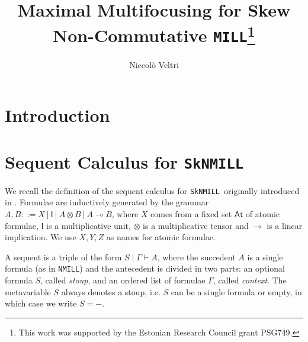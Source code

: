 \documentclass[runningheads]{llncs}
\newcommand{\ot}{\otimes}
\newcommand{\lolli}{\multimap}
\newcommand{\I}{\mathsf{I}}
\newcommand{\MILL}{\texttt{MILL}}
\newcommand{\NMILL}{\texttt{NMILL}}
\newcommand{\SkNMILL}{\texttt{SkNMILL}}
\newcommand{\At}{\mathsf{At}}
\begin{document}
\title{Maximal Multifocusing for Skew Non-Commutative \MILL\thanks{This work was supported by the Estonian Research Council grant PSG749.}}

\author{Niccol{\`o} Veltri}
%
%
\maketitle
%
\begin{abstract}

\keywords{}  
\end{abstract}

\section{Introduction}

\section{Sequent Calculus for \SkNMILL}\label{sec2}

We recall the definition of the sequent calculus for \SkNMILL\ originally introduced in \cite{UVW:protsn}.
Formulae are inductively generated by the grammar $A,B ::= X \ | \ \I \ | \ A \ot B \ | \ A \lolli B$, where $X$ comes from a fixed set $\At$ of atomic formulae, $\I$ is a multiplicative unit, $\ot$ is a multiplicative tensor and $\lolli$ is a linear implication. We use $X,Y,Z$ as names for atomic formulae.

A sequent is a triple of the form $S \mid \Gamma \vdash A$, where the succedent $A$ is a single formula (as in \NMILL) and the antecedent is divided in two parts: an optional formula $S$, called \emph{stoup}, and an ordered list of formulae $\Gamma$, called \emph{context}. 
The metavariable $S$ always denotes a stoup, i.e. $S$ can be a single formula or empty, in which case we write $S = -$.
\end{document}
